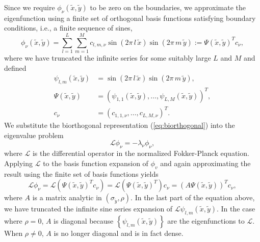 Since we require $\phi_\nu(\tilde{x},\tilde{y})$ to be zero on the boundaries, we
approximate the eigenfunction using a finite set of orthogonal basis
functions satisfying boundary conditions, i.e., a finite sequence of
sines,
\[
  \phi_\nu(\tilde{x},\tilde{y}) = \sum_{l=1}^L \sum_{m=1}^M c_{l,m, \nu}
  \sin\left(2\pi\, l\, \tilde{x} \right) \sin\left(2\pi\, m\, \tilde{y} \right) := \Psi(\tilde{x},\tilde{y})^T c_\nu,
\]
where we have truncated the infinite series for some suitably large
$L$ and $M$ and defined
\begin{align*}
  \psi_{l,m}(\tilde{x},\tilde{y}) &= \sin\left(2\pi\, l\, \tilde{x} \right)
                         \sin\left(2\pi\, m\, \tilde{y} \right), \\
  \Psi(\tilde{x},\tilde{y}) &= (\psi_{1,1}(\tilde{x},\tilde{y}), \ldots, \psi_{L,M}(\tilde{x},\tilde{y}))^T, \\
  c_\nu &= (c_{1,1,\nu}, \ldots, c_{L,M,\nu})^T.
\end{align*}
We substitute the biorthogonal representation (\ref{eq:biorthogonal})
into the eigenvalue problem
\begin{equation}
  \mathcal{L} \phi_\nu = -\lambda_\nu \phi_\nu, \label{eq:eigenproblem}
\end{equation}
where $\mathcal{L}$ is the differential operator in the normalized
Fokker-Planck equation. Applying $\mathcal{L}$ to the basis function
expansion of $\phi_v $ and again approximating the result using the
finite set of basis functions yields
\begin{equation}
  \mathcal{L}\phi_\nu = \mathcal{L}(\Psi(\tilde{x},\tilde{y})^T c_\nu) =
  \mathcal{L}(\Psi(\tilde{x},\tilde{y})^T) c_\nu = (A \Psi(\tilde{x},\tilde{y}))^T c_\nu, \label{eq:system}
\end{equation}
where $A$ is a matrix analytic in $(\sigma_{\tilde{y}}, \rho)$. In the
last part of the equation above, we have truncated the infinite sine
series expansion of $\mathcal{L} \psi_{l, m}(\tilde{x},\tilde{y})$. In the case where
$\rho = 0$, $A$ is diagonal because $\left\{ \psi_{l,m}(\tilde{x},\tilde{y}) \right\}$
are the eigenfunctions to $\mathcal{L}$. When $\rho \neq 0$, $A$ is no
longer diagonal and is in fact dense. %
